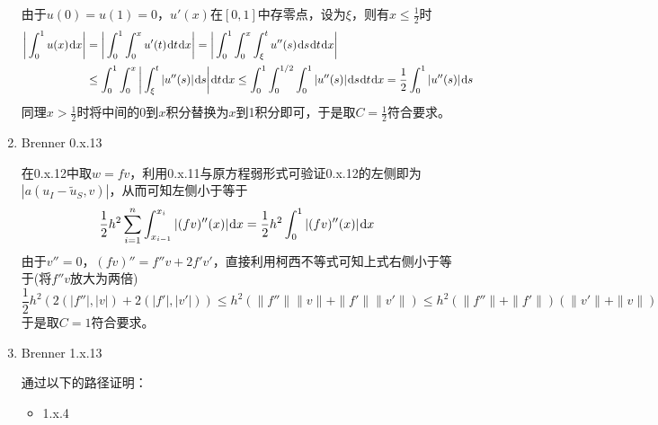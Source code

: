 \documentclass[a4paper,UTF8,fontset=windows,10pt]{ctexart}
\newcommand*{\dr}{\hspace{0.07em}\mathrm{d}}
\begin{document}
\begin{enumerate}
    由于$u(0)=u(1)=0$，$u'(x)$在$[0,1]$中存零点，设为$\xi$，则有$x\le\frac{1}{2}$时
    $$\begin{aligned}\bigg|\int_0^1u(x)\dr x\bigg|&=\bigg|\int_0^1\int_0^xu'(t)\dr t\dr x\bigg|=\bigg|\int_0^1\int_0^x\int_\xi^tu''(s)\dr s\dr t\dr x\bigg|\\ &\le\int_0^1\int_0^x\bigg|\int_\xi^t|u''(s)|\dr s\bigg|\dr t\dr x\le\int_0^1\int_0^{1/2}\int_0^1|u''(s)|\dr s\dr t\dr x=\frac{1}{2}\int_0^1|u''(s)|\dr s\end{aligned}$$
    同理$x>\frac{1}{2}$时将中间的0到$x$积分替换为$x$到1积分即可，于是取$C=\frac{1}{2}$符合要求。
    
    \item Brenner 0.x.13
    
    在0.x.12中取$w=fv$，利用0.x.11与原方程弱形式可验证0.x.12的左侧即为$|a(u_I-\tilde{u}_S,v)|$，从而可知左侧小于等于
    $$\frac{1}{2}h^2\sum_{i=1}^n\int_{x_{i-1}}^{x_i}|(fv)''(x)|\dr x=\frac{1}{2}h^2\int_0^1|(fv)''(x)|\dr x$$
    由于$v''=0$，$(fv)''=f''v+2f'v'$，直接利用柯西不等式可知上式右侧小于等于(将$f''v$放大为两倍)
    $$\frac{1}{2}h^2(2(|f''|,|v|)+2(|f'|,|v'|))\le h^2(\|f''\|\|v\|+\|f'\|\|v'\|)\le h^2(\|f''\|+\|f'\|)(\|v'\|+\|v\|)$$
    于是取$C=1$符合要求。
    
    \item Brenner 1.x.13
    
    通过以下的路径证明：
    \begin{itemize}
        \item 1.x.4
        

\end{itemize}
\end{enumerate}
\end{document}
